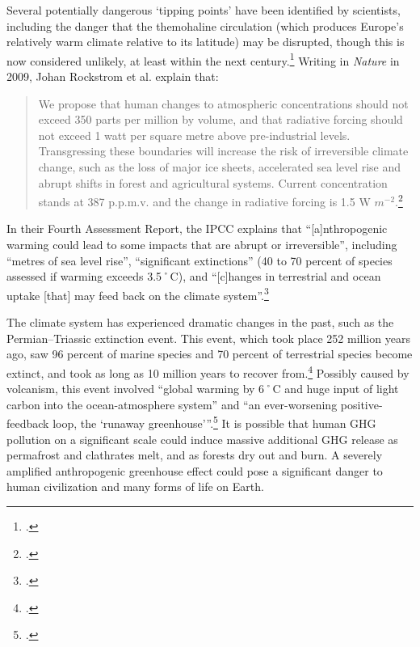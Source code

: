 \documentclass[10pt]{article}
\begin{document}
Several potentially dangerous `tipping points' have been identified by scientists, including the danger that the themohaline circulation (which produces Europe's relatively warm climate relative to its latitude) may be disrupted, though this is now considered unlikely, at least within the next century.\footcite[][]{IPCCThermohaline}
Writing in \emph{Nature} in 2009, Johan Rockstrom et al. explain that:
\begin{quote}
We propose that human changes to atmospheric  concentrations should not exceed 350 parts per million by volume, and that radiative forcing should not exceed 1 watt per square metre above pre-industrial levels. Transgressing these boundaries will increase the risk of irreversible climate change, such as the loss of major ice sheets, accelerated sea level rise and abrupt shifts in forest and agricultural systems. Current  concentration stands at 387 p.p.m.v. and the change in radiative forcing is 1.5 W $m^{−2}$.\footcite[][]{SafeOperatingSpace}
\end{quote}
In their Fourth Assessment Report, the IPCC explains that ``[a]nthropogenic warming could lead to some impacts that are abrupt or irreversible'', including ``metres of sea level rise'', ``significant extinctions'' (40 to 70 percent of species assessed if warming exceeds 3.5˚C), and ``[c]hanges in terrestrial and ocean  uptake [that] may feed back on the climate system''.\footcite[][p. 53]{IPCCar4_syr}



The climate system has experienced dramatic changes in the past, such as the Permian–Triassic extinction event.
This event, which took place 252 million years ago, saw 96 percent of marine species and 70 percent of terrestrial species become extinct, and took as long as 10 million years to recover from.\footcite[][p. 759--765]{PTRecovery}
Possibly caused by volcanism, this event involved ``global warming by 6˚C and huge input of light carbon into the ocean-atmosphere system'' and ``an ever-worsening positive-feedback loop, the `runaway greenhouse'''.\footcite[][p. 358]{EndPermian}
It is possible that human GHG pollution on a significant scale could induce massive additional GHG release as permafrost and clathrates melt, and as forests dry out and burn.
A severely amplified anthropogenic greenhouse effect could pose a significant danger to human civilization and many forms of life on Earth.
\end{document}
